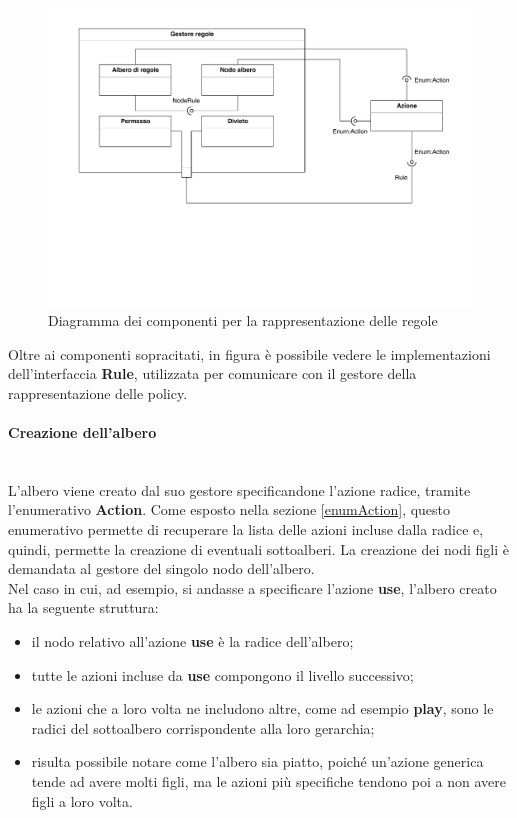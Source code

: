\documentclass[12pt,a4paper,twoside]{book}
\begin{document}
\begin{figure}[H]
\centering
\includegraphics[scale=.60]{../immagini/imgCompRule}
\caption{Diagramma dei componenti per la rappresentazione delle regole}
\label{imgCompRule}
\end{figure}
Oltre ai componenti sopracitati, in figura è possibile vedere le implementazioni dell'interfaccia \textbf{Rule}, utilizzata per comunicare con il gestore della rappresentazione delle policy.
\paragraph{Creazione dell'albero}\mbox{}\\
L'albero viene creato dal suo gestore specificandone l'azione radice, tramite l'enumerativo \textbf{Action}. Come esposto nella sezione \ref{enumAction}, questo enumerativo permette di recuperare la lista delle azioni incluse dalla radice e, quindi, permette la creazione di eventuali sottoalberi. La creazione dei nodi figli è demandata al gestore del singolo nodo dell'albero.\\
Nel caso in cui, ad esempio, si andasse a specificare l'azione \textbf{use}, l'albero creato ha la seguente struttura:
\begin{itemize}
\item il nodo relativo all'azione \textbf{use} è la radice dell'albero;
\item tutte le azioni incluse da \textbf{use} compongono il livello successivo;
\item le azioni che a loro volta ne includono altre, come ad esempio \textbf{play}, sono le radici del sottoalbero corrispondente alla loro gerarchia;
\item risulta possibile notare come l'albero sia piatto, poiché un'azione generica tende ad avere molti figli, ma le azioni più specifiche tendono poi a non avere figli a loro volta.
\end{itemize}
\end{document}
